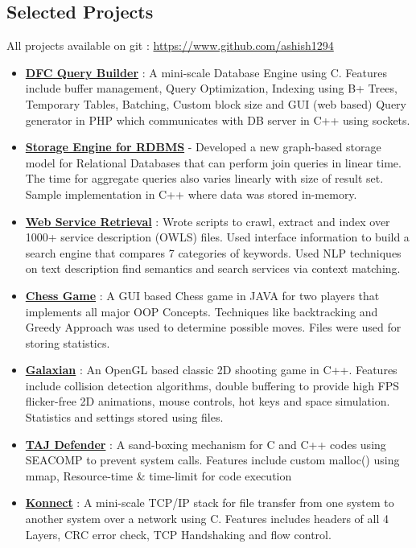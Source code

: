 \documentclass[margin, centered]{res}
\begin{document}
\begin{resume}
\section{Selected Projects}
All projects available on git : \url{https://www.github.com/ashish1294}
\begin{itemize}[leftmargin=*]
 \item \textbf{\href{https://github.com/Bug-Assassins/DFC_query_builder}{DFC Query Builder}} : A mini-scale Database Engine using C. Features include buffer management, Query Optimization, Indexing using B+ Trees, Temporary Tables, Batching, Custom block size and GUI (web based) Query generator in PHP which communicates with DB server in C++ using sockets.
 \item \textbf{\href{https://github.com/Bug-Assassins/Relational-Graph-Database}{Storage Engine for RDBMS}} - Developed a new graph-based storage model for Relational Databases that can perform join queries in linear time. The time for aggregate queries also varies linearly with size of result set. Sample implementation in C++ where data was stored in-memory.
 \item \textbf{\href{https://github.com/Bug-Assassins/web_service_retrieval}{Web Service Retrieval}} : Wrote scripts to crawl, extract and index over 1000+ service description (OWLS) files. Used interface information to build a search engine that compares 7 categories of keywords. Used NLP techniques on text description find semantics and search services via context matching.
 \item \textbf{\href{https://github.com/ashish1294/ChessOOP}{Chess Game}} : A GUI based Chess game in JAVA for two players that implements all major OOP Concepts. Techniques like backtracking and Greedy Approach was used to determine possible moves. Files were used for storing statistics.
 \item \textbf{\href{https://github.com/Bug-Assassins/Galaxian}{Galaxian}} : An OpenGL based classic 2D shooting game in C++. Features include collision detection algorithms, double buffering to provide high FPS flicker-free 2D animations, mouse controls, hot keys and space simulation. Statistics and settings stored using files.
 \item \textbf{\href{https://github.com/Bug-Assassins/TAJ-Defender}{TAJ Defender}} : A sand-boxing mechanism for C and C++ codes using SEACOMP to prevent system calls. Features include custom malloc() using mmap, Resource-time \& time-limit for code execution
 \item \textbf{\href{https://github.com/Bug-Assassins/Konnect}{Konnect}} : A mini-scale TCP/IP stack for file transfer from one system to another system over a network using C. Features includes headers of all 4 Layers, CRC error check, TCP Handshaking and flow control.

\end{itemize}
\end{resume}
\end{document}
